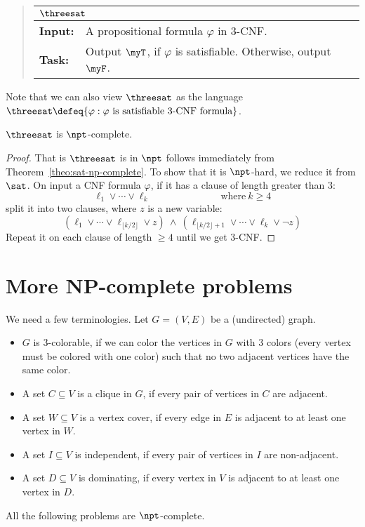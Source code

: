\documentclass[11pt, a4paper]{article}
\begin{document}
\begin{quote}
{\def\arraystretch{1.25}
\begin{tabular}{|ll|}
\hline
\multicolumn{2}{|l|}{$\threesat$}
\\
\hline\hline
{\bf Input:}
&
A propositional formula $\varphi$ in 3-CNF.
\\
{\bf Task:}
&
Output $\myT$, if 
$\varphi$ is satisfiable.
Otherwise, output $\myF$.
\\
\hline
\end{tabular}}
\end{quote}
Note that we can also view
$\threesat$ as the language
$\threesat \defeq \{\varphi : \varphi \ \text{is satisfiable 3-CNF formula}\}$.

\begin{theorem}
\label{theo:threesat-np-complete}
$\threesat$ is $\npt$-complete.
\end{theorem}
\begin{proof}
That is $\threesat$ is in $\npt$ follows immediately from Theorem~\ref{theo:sat-np-complete}.
To show that it is $\npt$-hard, we reduce it from $\sat$.
On input a CNF formula $\varphi$,
if it has a clause of length greater than $3$:
$$
\ell_1 \vee \cdots \vee \ell_k
\hspace{3cm}\text{where}\ k \geq 4
$$
split it into two clauses, where $z$ is a new variable:
$$
(\ell_1 \vee \cdots \vee \ell_{\lfloor k/2\rfloor}\vee z)\ \wedge\ 
(\ell_{\lfloor k/2\rfloor+1}\vee \cdots \vee \ell_k \vee \neg z)
$$
Repeat it on each clause of length $\geq 4$ until we get 3-CNF.
\end{proof}


\section{More NP-complete problems}

We need a few terminologies.
Let $G=(V,E)$ be a (undirected) graph.
\begin{itemize}\itemsep=0pt
\item
$G$ is $3$-colorable, if we can color the vertices in $G$
with 3 colors (every vertex must be colored with one color)
such that no two adjacent vertices have the same color.
\item
A set $C\subseteq V$ is a clique in $G$, if 
every pair of vertices in $C$ are adjacent.
\item
A set $W\subseteq V$ is a vertex cover, if 
every edge in $E$ is adjacent to at least one vertex in $W$.
\item
A set $I\subseteq V$ is independent, if 
every pair of vertices in $I$ are non-adjacent.
\item
A set $D\subseteq V$ is dominating, if
every vertex in $V$ is adjacent to at least one vertex in $D$.
\end{itemize}
All the following problems are $\npt$-complete.
\end{document}
